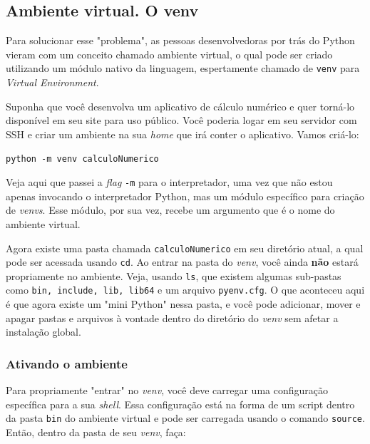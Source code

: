 \documentclass{article}
\begin{document}
	\newpage

	\subsection{Ambiente virtual. O venv} 

	Para solucionar esse "problema", as pessoas desenvolvedoras por trás do Python vieram com um conceito chamado ambiente
	virtual, o qual pode ser criado utilizando um módulo nativo da linguagem, espertamente chamado de \texttt{venv} para 
	\textit{Virtual Environment}.

	Suponha que você desenvolva um aplicativo de cálculo numérico e quer torná-lo disponível em seu site para uso público.
	Você poderia logar em seu servidor com SSH e criar um ambiente na sua \textit{home} que irá conter o aplicativo. 
	Vamos criá-lo: 
	
	\vspace{1ex}
	\texttt{python -m venv calculoNumerico} 
	\vspace{1ex} 

	Veja aqui que passei a \textit{flag} \texttt{-m} para o interpretador, uma vez que não estou apenas invocando o interpretador Python,
	mas um módulo específico para criação de \textit{venvs}. Esse módulo, por sua vez, recebe um argumento que é o nome do 
	ambiente virtual.

	Agora existe uma pasta chamada \texttt{calculoNumerico} em seu diretório atual, a qual pode ser acessada usando \texttt{cd}. 
	Ao entrar na pasta do \textit{venv}, você ainda \textbf{não} estará propriamente no ambiente. Veja, usando \texttt{ls},
	que existem algumas sub-pastas como \texttt{bin, include, lib, lib64} e um arquivo \texttt{pyenv.cfg}. O que aconteceu aqui
	é que agora existe um "mini Python" nessa pasta, e você pode adicionar, mover e apagar pastas e arquivos à vontade dentro
	do diretório do \textit{venv} sem afetar a instalação global. 

	\subsubsection{Ativando o ambiente} 

	Para propriamente "entrar" no \textit{venv}, você deve carregar uma configuração específica para a sua \textit{shell}. 
	Essa configuração está na forma de um script dentro da pasta \texttt{bin} do ambiente virtual e pode ser carregada usando o 
	comando \texttt{source}. Então, dentro da pasta de seu \textit{venv}, faça:
\end{document}
